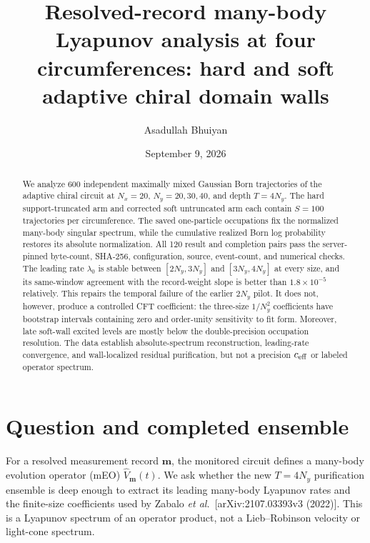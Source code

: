 \documentclass[aps,prb,twocolumn,floatfix,nofootinbib,superscriptaddress]{revtex4-2}
\begin{document}
\title{Resolved-record many-body Lyapunov analysis at four circumferences:
hard and soft adaptive chiral domain walls}

\author{Asadullah Bhuiyan}
\date{September 9, 2026}

\begin{abstract}
We analyze 600 independent maximally mixed Gaussian Born trajectories of the
adaptive chiral circuit at $N_x=20$, $N_y=20,30,40$, and depth $T=4N_y$.
The hard support-truncated arm and corrected soft untruncated arm each contain
$S=100$ trajectories per circumference.  The saved one-particle occupations
fix the normalized many-body singular spectrum, while the cumulative realized
Born log probability restores its absolute normalization.  All 120 result and
completion pairs pass the server-pinned byte-count, SHA-256, configuration,
source, event-count, and numerical checks.  The leading rate $\lambda_0$ is
stable between $[2N_y,3N_y]$ and $[3N_y,4N_y]$ at every size, and its
same-window agreement with the record-weight slope is better than
$1.8\times10^{-5}$ relatively.  This repairs the temporal failure of the
earlier $2N_y$ pilot.  It does not, however, produce a controlled CFT
coefficient: the three-size $1/N_y^2$ coefficients have bootstrap intervals
containing zero and order-unity sensitivity to fit form.  Moreover, late
soft-wall excited levels are mostly below the double-precision occupation
resolution.  The data establish absolute-spectrum reconstruction, leading-rate
convergence, and wall-localized residual purification, but not a precision
$c_{\rm eff}$ or labeled operator spectrum.
\end{abstract}

\maketitle

\section{Question and completed ensemble}

For a resolved measurement record $\bm m$, the monitored circuit defines a
many-body evolution operator (mEO) $\hat V_{\bm m}(t)$.  We ask whether the
new $T=4N_y$ purification ensemble is deep enough to extract its leading
many-body Lyapunov rates and the finite-size coefficients used by Zabalo
\emph{et al.}\ [arXiv:2107.03393v3 (2022)].  This is a Lyapunov spectrum of an operator
product, not a Lieb--Robinson velocity or light-cone spectrum.
\end{document}
